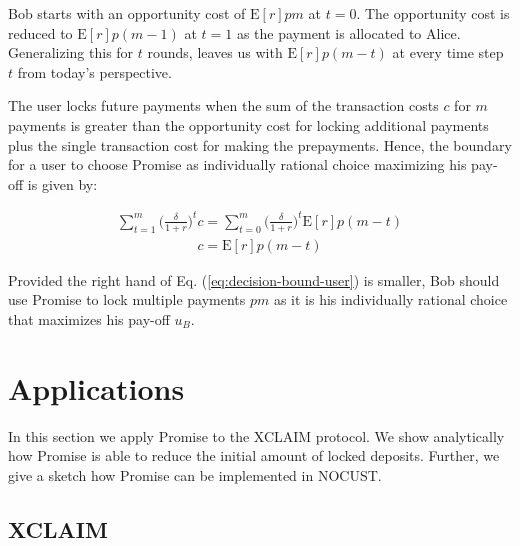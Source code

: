 \documentclass[runningheads]{llncs}
\newcommand{\sys}{Promise\xspace}
\newcommand{\aza}[1]{\todo[linecolor=blue,backgroundcolor=blue!25,bordercolor=blue,inline,caption={}]{Comment by Alexei: #1}}
\begin{document}
Bob starts with an opportunity cost of $\mathrm{E}[r]pm$ at $t=0$. 
The opportunity cost is reduced to $\mathrm{E}[r]p(m-1)$ at $t=1$ as the payment is allocated to Alice.
Generalizing this for $t$ rounds, leaves us with $\mathrm{E}[r]p(m-t)$ at every time step $t$ from today's perspective.

The user locks future payments when the sum of the transaction costs $c$ for $m$ payments is greater than the opportunity cost for locking additional payments plus the single transaction cost for making the prepayments.
Hence, the boundary for a user to choose \sys as individually rational choice maximizing his pay-off is given by:

\begin{align}
    \sum_{t=1}^m \big( \frac{\delta}{1+r} \big)^t c = \sum_{t=0}^m \big( \frac{\delta}{1+r} \big)^t \mathrm{E}[r]p(m-t)
\end{align}
\begin{align}
\label{eq:decision-bound-user}
c = \mathrm{E}[r]p(m-t)    
\end{align}

Provided the right hand of Eq. (\ref{eq:decision-bound-user}) is smaller, Bob should use \sys to lock multiple payments $pm$ as it is his individually rational choice that maximizes his pay-off $u_B$.









\section{Applications}
\label{sec:application}

In this section we apply \sys to the XCLAIM protocol.
We show analytically how \sys is able to reduce the initial amount of locked deposits.
Further, we give a sketch how \sys can be implemented in NOCUST.

\subsection{XCLAIM}
\label{sec:xclaim}
\end{document}
